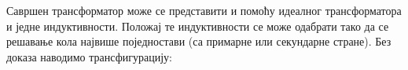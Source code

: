 Савршен трансформатор може се представити и помоћу 
идеалног трансформатора и једне индуктивности. Положај 
те индуктивности се 
може одабрати тако да се решавање кола 
највише поједностави
(са примарне или секундарне стране). Без доказа наводимо 
трансфигурацију: \\[0.5mm]
 

